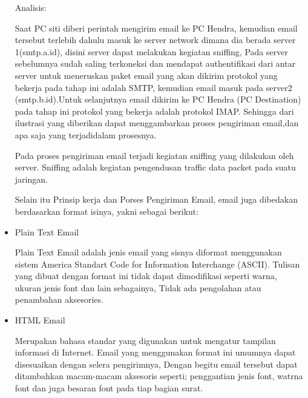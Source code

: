 \begin{itemize}
\vspace{12pt}
Analisis: \par
Saat PC siti diberi perintah mengirim email ke PC Hendra, kemudian email tersebut terlebih dahulu masuk ke server network dimana dia berada server 1(smtp.a.id), disini server dapat melakukan kegiatan sniffing, Pada server sebelumnya sudah saling terkoneksi dan mendapat authentifikasi dari antar server untuk meneruskan paket email yang akan dikirim protokol yang bekerja pada tahap ini adalah SMTP, kemudian email masuk pada server2 (smtp.b.id).Untuk selanjutnya email dikirim ke PC Hendra (PC Destination) pada tahap ini protokol yang bekerja adalah protokol IMAP. Sehingga dari ilustrasi yang diberikan dapat menggambarkan proses pengiriman email,dan apa saja yang terjadidalam prosesnya. \par
\vspace{12pt}
Pada proses pengiriman email terjadi kegiatan sniffing yang dilakukan oleh server. Sniffing adalah kegiatan pengendusan traffic data packet pada suatu jaringan. \par
\vspace{12pt}
Selain itu Prinsip kerja dan Porses Pengiriman Email, email juga dibedakan berdasarkan format isinya, yakni sebagai berikut: \par
\vspace{12pt}
\noindent 
\item Plain Text Email \par
Plain Text Email adalah jenis email yang sisnya diformat menggunakan sistem America Standart Code for Information Interchange (ASCII). Tulisan yang dibuat dengan format ini tidak dapat dimodifikasi seperti warna, ukuran jenis font dan lain sebagainya, Tidak ada pengolahan atau penambahan aksesories. \par
\noindent 
\item HTML Email \par
Merupakan bahasa standar yang digunakan untuk mengatur tampilan informasi di Internet. Email yang menggunakan format ini umumnya dapat disesuaikan dengan selera pengirimnya, Dengan begitu email tersebut dapat ditambahkan macam-macam aksesoris seperti; penggantian jenis font, watrna font dan juga besaran font pada tiap bagian surat. \par
\end{itemize}
\vspace{12pt}
\noindent 
